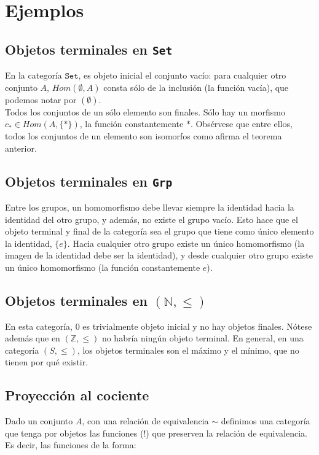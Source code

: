 \documentclass[11pt, fleqn, spanish]{book}
\begin{document}
\section {Ejemplos}

\subsection {Objetos terminales en \texttt{Set}}
En la categoría $\mathtt{Set}$, es objeto inicial el conjunto vacío:
para cualquier otro conjunto $A$, $Hom(\emptyset, A)$ consta sólo de
la inclusión (la función vacía), que podemos notar por $(\emptyset)$.
\\
Todos los conjuntos de un sólo elemento son finales. Sólo hay un
morfismo $c_\ast \in Hom(A,\{\ast\})$, la función constantemente
$\ast$. Obsérvese que entre ellos, todos los conjuntos de un elemento
son isomorfos como afirma el teorema anterior.
    
\subsection {Objetos terminales en \texttt{Grp}}
Entre los grupos, un homomorfismo debe llevar siempre la identidad
hacia la identidad del otro grupo, y además, no existe el grupo
vacío. Esto hace que el objeto terminal y final de la categoría sea el
grupo que tiene como único elemento la identidad, $\{e\}$.  Hacia
cualquier otro grupo existe un único homomorfismo (la imagen de la
identidad debe ser la identidad), y desde cualquier otro grupo existe
un único homomorfismo (la función constantemente $e$).

\subsection {Objetos terminales en $(\mathbb{N},\leq)$}
En esta categoría, $0$ es trivialmente objeto inicial y no hay objetos
finales.  Nótese además que en $(\mathbb{Z},\leq)$ no habría ningún
objeto terminal. En general, en una categoría $(S,\leq)$, los objetos
terminales son el máximo y el mínimo, que no tienen por qué existir.
    
\subsection {Proyección al cociente}
Dado un conjunto $A$, con una relación de equivalencia $\sim$
definimos una categoría que tenga por objetos las funciones (!) que
preserven la relación de equivalencia.  Es decir, las funciones de la
forma:
\end{document}
